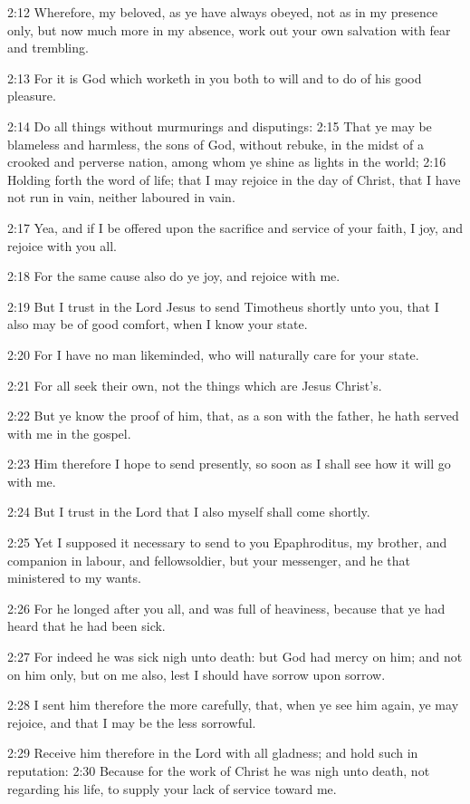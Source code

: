 2:12 Wherefore, my beloved, as ye have always obeyed, not as in my presence only, but now much more in my absence, work out your own salvation with fear and trembling.

2:13 For it is God which worketh in you both to will and to do of his good pleasure.

2:14 Do all things without murmurings and disputings: 2:15 That ye may be blameless and harmless, the sons of God, without rebuke, in the midst of a crooked and perverse nation, among whom ye shine as lights in the world; 2:16 Holding forth the word of life; that I may rejoice in the day of Christ, that I have not run in vain, neither laboured in vain.

2:17 Yea, and if I be offered upon the sacrifice and service of your faith, I joy, and rejoice with you all.

2:18 For the same cause also do ye joy, and rejoice with me.

2:19 But I trust in the Lord Jesus to send Timotheus shortly unto you, that I also may be of good comfort, when I know your state.

2:20 For I have no man likeminded, who will naturally care for your state.

2:21 For all seek their own, not the things which are Jesus Christ's.

2:22 But ye know the proof of him, that, as a son with the father, he hath served with me in the gospel.

2:23 Him therefore I hope to send presently, so soon as I shall see how it will go with me.

2:24 But I trust in the Lord that I also myself shall come shortly.

2:25 Yet I supposed it necessary to send to you Epaphroditus, my brother, and companion in labour, and fellowsoldier, but your messenger, and he that ministered to my wants.

2:26 For he longed after you all, and was full of heaviness, because that ye had heard that he had been sick.

2:27 For indeed he was sick nigh unto death: but God had mercy on him; and not on him only, but on me also, lest I should have sorrow upon sorrow.

2:28 I sent him therefore the more carefully, that, when ye see him again, ye may rejoice, and that I may be the less sorrowful.

2:29 Receive him therefore in the Lord with all gladness; and hold such in reputation: 2:30 Because for the work of Christ he was nigh unto death, not regarding his life, to supply your lack of service toward me.

